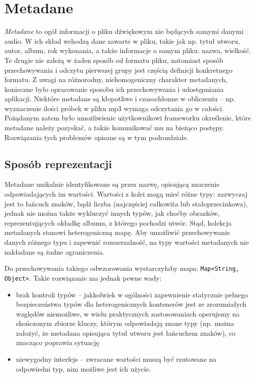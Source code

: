
\section{Metadane}

\emph{Metadane} to ogół informacji o pliku dźwiękowym nie będących samymi danymi audio. W ich skład
wchodzą dane zawarte w pliku, takie jak np. tytuł utworu, autor, album, rok wykonania, a także
informacje o samym pliku: nazwa, wielkość. Te drugie nie zależą w żaden sposób od formatu pliku,
natomiast sposób przechowywania i odczytu pierwszej grupy jest częścią definicji konkretnego
formatu. Z uwagi na różnorodny, niehomogeniczny charakter metadanych, konieczne było opracowanie
sposobu ich przechowywania i udostępniania aplikacji. Niektóre metadane są kłopotliwe i czasochłonne
w obliczeniu -- np. wyznaczenie ilości próbek w pliku mp3 wymaga odczytania go w całości. Pożądanym
zatem było umożliwienie użytkownikowi frameworku określenie, które metadane należy pozyskać, a także
komunikować mu na bieżąco postępy. Rozwiązania tych problemów opisane są w tym podrozdziale.

\subsection{Sposób reprezentacji}

Metadane unikalnie identyfikowane są przez nazwę, opisującą znaczenie odpowiadających im wartości.
Wartości z kolei mogą mieć różne typy: zazwyczaj jest to łańcuch znaków, bądź liczba (najczęściej
całkowita lub stałoprzecinkowa), jednak nie można także wykluczyć innych typów, jak choćby obrazków,
reprezentujących okładkę albumu, z którego pochodzi utwór. Stąd, kolekcja metadanych stanowi
heterogeniczną mapę. Aby umożliwić przechowywanie danych różnego typu i zapewnić rozszerzalność, na
typy wartości metadanych nie nakładane są żadne ograniczenia.

Do przechowywania takiego odwzorowania wystarczyłaby mapa: \texttt{Map<String, Object>}. Takie
rozwiązanie ma jednak pewne wady:

\begin{itemize}

  \item brak kontroli typów -- jakkolwiek w ogólności zapewnienie statycznie pełnego bezpieczeństwa
typów dla heterogenicznych kontenerów jest ze zrozumiałych względów niemożliwe, w wielu praktycznych
zastosowaniach operujemy na skończonym zbiorze kluczy, którym odpowiadają znane typy (np. można
założyć, że metadana opisująca tytuł utworu jest łańcuchem znaków), co znacząco poprawia sytuację

  \item niewygodny interfejs -- zwracane wartości muszą być rzutowane na odpowiedni typ, nim możliwe
jest ich użycie.

\end{itemize}

